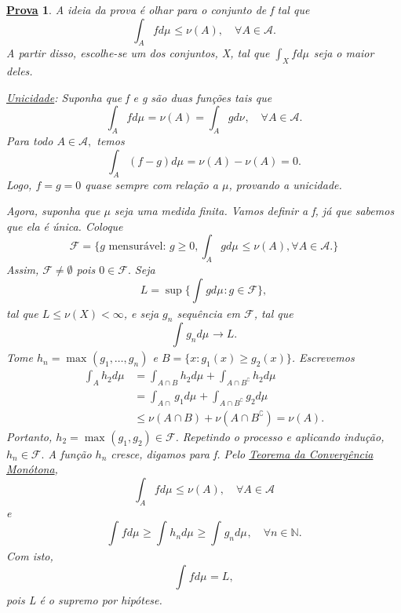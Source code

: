 \documentclass{article}
\newtheorem*{proof*}{\underline{Prova}}
\begin{document}
 \begin{proof*}
   A ideia da prova é olhar para o conjunto de f tal que 
     \[
       \int_{A}f d\mu_{} \leq \nu(A),\quad \forall A\in \mathcal{A}.
     \]
    A partir disso, escolhe-se um dos conjuntos, X, tal que \(\int_{X}f d\mu_{}\) seja o maior deles. 

  \textit{\underline{Unicidade}:} Suponha que f e g são duas funções tais que 
    \[
      \int_{A}f d\mu_{} = \nu (A) = \int_{A}g d\nu_{},\quad \forall A\in \mathcal{A}.
    \]
  Para todo \(A\in \mathcal{A},\) temos 
    \[
      \int_{A}(f-g) d\mu_{} = \nu (A) - \nu(A) = 0.
    \]
  Logo, \(f = g = 0\) quase sempre com relação a \(\mu \), provando a unicidade.

  Agora, suponha que \(\mu \) seja uma medida finita. Vamos definir a f, já que sabemos que ela é única. Coloque 
    \[
      \mathcal{F} = \{g \text{ mensurável: } g\geq 0, \int_{A}g d\mu_{}\leq \nu (A), \forall A\in \mathcal{A}.\}
    \]
  Assim, \(\mathcal{F}\neq\emptyset\) pois \(0\in \mathcal{F}.\) Seja 
    \[
      L = \sup_{}\biggl\{\int_{}g d\mu_{}: g\in \mathcal{F}\biggr\},
    \]
  tal que \(L\leq \nu (X) < \infty\), e seja \(g_{n}\) sequência em \(\mathcal{F}\), tal que 
    \[
      \int_{}g_{n} d\mu_{}\to L.
    \]
    Tome \(h_{n} = \max_{}(g_1, \dotsc , g_{n})\) e \(B = \{x: g_1(x) \geq g_2(x)\}\). Escrevemos 
   \begin{align*}
     \int_{A}h_2 d\mu_{} &= \int_{A\cap B}h_2 d\mu_{} + \int_{A\cap B ^{\complement}}h_2 d\mu_{}\\ 
                         &= \int_{A\cap }g_1 d\mu_{} + \int_{A\cap B ^{\complement}}g_2 d\mu_{}\\ 
                         &\leq \nu (A\cap B) + \nu (A\cap B ^{\complement}) = \nu (A).
   \end{align*}
  Portanto, \(h_2=\max_{}(g_1, g_2)\in \mathcal{F}\). Repetindo o processo e aplicando indução, \(h_{n}\in \mathcal{F}.\) A função \(h_{n}\) cresce, digamos para f. Pelo \hyperlink{monotone_convergence}{Teorema da Convergência Monótona},
    \[
      \int_{A}f d\mu_{}\leq \nu (A), \quad \forall A\in \mathcal{A}
    \]
  e 
    \[
      \int_{}f d\mu_{} \geq \int_{}h_{n} d\mu_{}\geq \int_{}g_{n} d\mu_{},\quad \forall n\in \mathbb{N}.
    \]
  Com isto, 
    \[
      \int_{}f d\mu_{} = L,
    \]
  pois L é o supremo por hipótese. 


\end{proof*}
\end{document}
